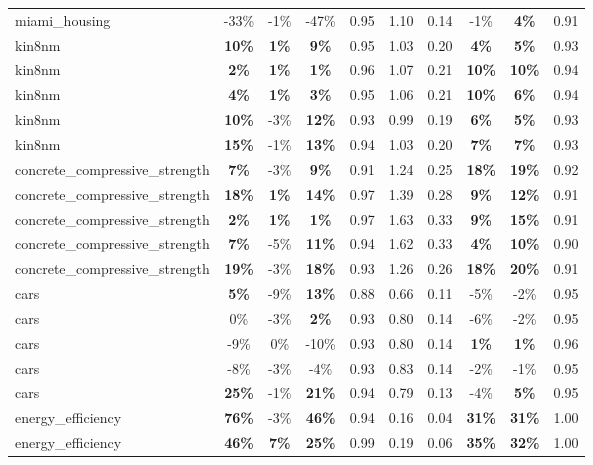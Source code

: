 \begin{table}[!htbp]
\begin{small}
\begin{sc}
{\begin{tabular}{lccccccccc}
miami\_housing & -33\% & -1\% & -47\% & 0.95 & 1.10 & 0.14 & -1\% & \textbf{4\%} & 0.91 \\
kin8nm & \textbf{10\%} & \textbf{1\%} & \textbf{9\%} & 0.95 & 1.03 & 0.20 & \textbf{4\%} & \textbf{5\%} & 0.93 \\
kin8nm & \textbf{2\%} & \textbf{1\%} & \textbf{1\%} & 0.96 & 1.07 & 0.21 & \textbf{10\%} & \textbf{10\%} & 0.94 \\
kin8nm & \textbf{4\%} & \textbf{1\%} & \textbf{3\%} & 0.95 & 1.06 & 0.21 & \textbf{10\%} & \textbf{6\%} & 0.94 \\
kin8nm & \textbf{10\%} & -3\% & \textbf{12\%} & 0.93 & 0.99 & 0.19 & \textbf{6\%} & \textbf{5\%} & 0.93 \\
kin8nm & \textbf{15\%} & -1\% & \textbf{13\%} & 0.94 & 1.03 & 0.20 & \textbf{7\%} & \textbf{7\%} & 0.93 \\
concrete\_compressive\_strength & \textbf{7\%} & -3\% & \textbf{9\%} & 0.91 & 1.24 & 0.25 & \textbf{18\%} & \textbf{19\%} & 0.92 \\
concrete\_compressive\_strength & \textbf{18\%} & \textbf{1\%} & \textbf{14\%} & 0.97 & 1.39 & 0.28 & \textbf{9\%} & \textbf{12\%} & 0.91 \\
concrete\_compressive\_strength & \textbf{2\%} & \textbf{1\%} & \textbf{1\%} & 0.97 & 1.63 & 0.33 & \textbf{9\%} & \textbf{15\%} & 0.91 \\
concrete\_compressive\_strength & \textbf{7\%} & -5\% & \textbf{11\%} & 0.94 & 1.62 & 0.33 & \textbf{4\%} & \textbf{10\%} & 0.90 \\
concrete\_compressive\_strength & \textbf{19\%} & -3\% & \textbf{18\%} & 0.93 & 1.26 & 0.26 & \textbf{18\%} & \textbf{20\%} & 0.91 \\
cars & \textbf{5\%} & -9\% & \textbf{13\%} & 0.88 & 0.66 & 0.11 & -5\% & -2\% & 0.95 \\
cars & 0\% & -3\% & \textbf{2\%} & 0.93 & 0.80 & 0.14 & -6\% & -2\% & 0.95 \\
cars & -9\% & 0\% & -10\% & 0.93 & 0.80 & 0.14 & \textbf{1\%} & \textbf{1\%} & 0.96 \\
cars & -8\% & -3\% & -4\% & 0.93 & 0.83 & 0.14 & -2\% & -1\% & 0.95 \\
cars & \textbf{25\%} & -1\% & \textbf{21\%} & 0.94 & 0.79 & 0.13 & -4\% & \textbf{5\%} & 0.95 \\
energy\_efficiency & \textbf{76\%} & -3\% & \textbf{46\%} & 0.94 & 0.16 & 0.04 & \textbf{31\%} & \textbf{31\%} & 1.00 \\
energy\_efficiency & \textbf{46\%} & \textbf{7\%} & \textbf{25\%} & 0.99 & 0.19 & 0.06 & \textbf{35\%} & \textbf{32\%} & 1.00 \\

\end{tabular}}
\end{sc}
\end{small}
\end{table}
